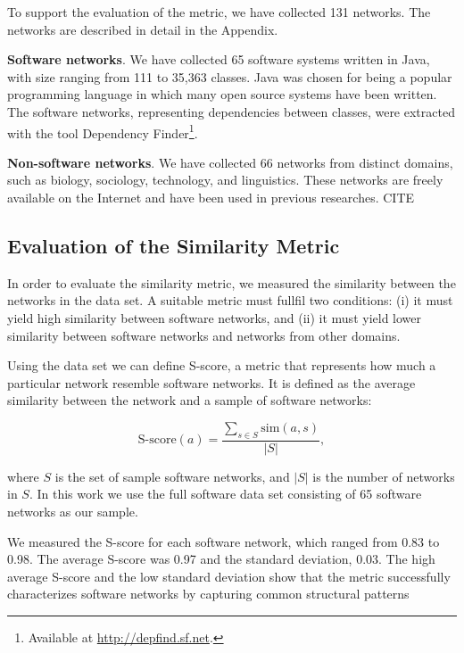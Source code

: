 To support the evaluation of the metric, we have collected 131 networks. The
networks are described in detail in the Appendix.

\textbf{Software networks}. We have collected 65 software systems written in
Java, with size ranging from 111 to 35,363 classes. Java was chosen for being a
popular programming language in which many open source systems have been
written. The software networks, representing dependencies between classes, were
extracted with the tool Dependency Finder\footnote{Available at
\url{http://depfind.sf.net}.}.

\textbf{Non-software networks}. We have collected 66 networks from distinct
domains, such as biology, sociology, technology, and linguistics. These networks
are freely available on the Internet and have been used in previous researches.
CITE


\subsection{Evaluation of the Similarity Metric}

In order to evaluate the similarity metric, we measured the similarity between
the networks in the data set. A suitable metric must fullfil two conditions: (i)
it must yield high similarity between software networks, and (ii) it must yield
lower similarity between software networks and networks from other domains.

Using the data set we can define S-score, a metric that represents how much a
particular network resemble software networks. It is defined as the average
similarity between the network and a sample of software networks:

$$
\mathrm{S\mbox{-}score}(a) = \frac{
\sum_{s \in S} \mathrm{sim}(a, s)
}{|S|} \mathrm{,}
$$

where $S$ is the set of sample software networks, and $|S|$ is the number of
networks in $S$. In this work we use the full software data set consisting of 65
software networks as our sample.

We measured the S-score for each software network, which ranged from 0.83 to
0.98. The average S-score was 0.97 and the standard deviation, 0.03. The high
average S-score and the low standard deviation show that the metric successfully
characterizes software networks by capturing common structural patterns


